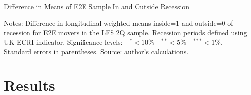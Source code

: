 \documentclass[preprint,12pt,authoryear]{elsarticle}
\begin{document}
\newpage
\thispagestyle{empty}
\begin{table}[H]
	\centering
	\caption{Difference in Means of E2E Sample In and Outside Recession}\label{tab:diffMeans}
	\begin{adjustbox}{max width=16cm, max height=10cm}
		\begin{threeparttable}
			
			\begin{tablenotes}
				\item \footnotesize{Notes: Difference in longitudinal-weighted means inside=1 and outside=0 of recession for E2E movers in the LFS 2Q sample. Recession periods defined using UK ECRI indicator. Significance levels:$ \quad ^{*}<10\% \quad ^{**}<5\% \quad ^{***}<1\%$. Standard errors in parentheses. Source: author's calculations.}  
			\end{tablenotes}
		\end{threeparttable}
	\end{adjustbox}
\end{table}
\newpage

\section{Results}
\label{sec:results}


\end{document}
